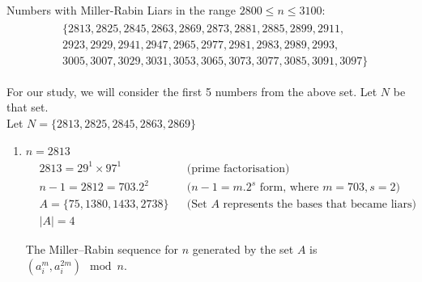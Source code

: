 \documentclass[11pt,a4paper]{article}
\begin{document}
\begin{enumerate}[1.]
\begin{flushleft}
			\medskip
			Numbers with Miller-Rabin Liars in the range $2800 \le n \le 3100$:
			\begin{align}
				\begin{split}
				&\{2813, 2825, 2845, 2863, 2869, 2873, 2881, 2885, 2899, 2911, \\
				&2923, 2929, 2941, 2947, 2965, 2977, 2981, 2983, 2989, 2993, \\
				&3005, 3007, 3029, 3031, 3053, 3065, 3073, 3077, 3085, 3091,3097\}
				\end{split}
			\end{align}

			For our study, we will consider the first 5 numbers from the above set. Let $N$ be that set.\\
			Let $N = \{2813, 2825, 2845, 2863, 2869\}$

			\begin{enumerate}[1.]
				\item $n = 2813$
				\begin{align}
					& 2813 = 29^1 \times 97^1 &&\text{(prime factorisation)}\nonumber\\
					& n - 1 = 2812 = 703.2^2 &&\text{($n - 1 = m.2^s$ form, where $m = 703, s = 2$)}\nonumber\\
					& A = \{75, 1380, 1433, 2738\}&&\text{(Set $A$ represents the bases that became liars)} \nonumber\\
					& |A| = 4 \nonumber
				\end{align}

				The Miller–Rabin sequence for $n$ generated by the set $A$ is $(a_i^m,a_i^{2m})\mod n$.


\end{enumerate}
\end{flushleft}
\end{enumerate}
\end{document}
